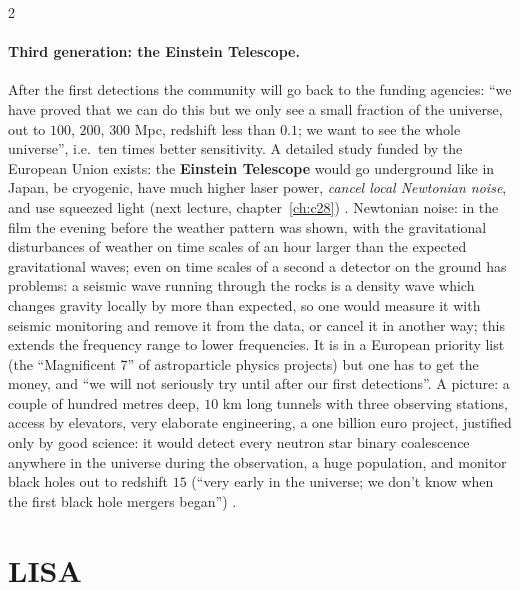 \begin{paracol}{2}
\paragraph{Third generation: the Einstein Telescope.} After the first detections the community will go back to the funding agencies: ``we have proved that we can do this but we only see a small fraction of the universe, out to $100$, $200$, $300$ Mpc, redshift less than $0.1$; we want to see the whole universe'', i.e.\ ten times better sensitivity. A detailed study funded by the European Union exists: the \textbf{Einstein Telescope} would go underground like in Japan, be cryogenic, have much higher laser power, \emph{cancel local Newtonian noise}, and use squeezed light (next lecture, chapter~\ref{ch:c28}) . Newtonian noise: in the film the evening before the weather pattern was shown, with the gravitational disturbances of weather on time scales of an hour larger than the expected gravitational waves; even on time scales of a second a detector on the ground has problems: a seismic wave running through the rocks is a density wave which changes gravity locally by more than expected, so one would measure it with seismic monitoring and remove it from the data, or cancel it in another way; this extends the frequency range to lower frequencies. It is in a European priority list (the ``Magnificent 7'' of astroparticle physics projects) but one has to get the money, and ``we will not seriously try until after our first detections''. A picture: a couple of hundred metres deep, $10$ km long tunnels with three observing stations, access by elevators, very elaborate engineering, a one billion euro project, justified only by good science: it would detect every neutron star binary coalescence anywhere in the universe during the observation, a huge population, and monitor black holes out to redshift $15$ (``very early in the universe; we don't know when the first black hole mergers began'') .

\section{LISA}\label{sec:c27-lisa}


\end{paracol}
